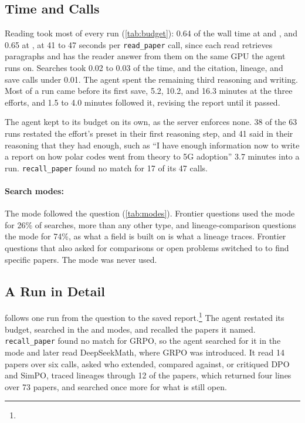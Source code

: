 \FloatBarrier
\subsection{Time and Calls}

Reading took most of every run (\cref{tab:budget}): 0.64 of the wall time at  and , and 0.65 at , at 41 to 47 seconds per \texttt{read\_paper} call, since each read retrieves paragraphs and has the reader answer from them on the same GPU the agent runs on. Searches took 0.02 to 0.03 of the time, and the citation, lineage, and save calls under 0.01. The agent spent the remaining third reasoning and writing. Most of a run came before its first save, 5.2, 10.2, and 16.3 minutes at the three efforts, and 1.5 to 4.0 minutes followed it, revising the report until it passed.

The agent kept to its budget on its own, as the server enforces none. 38 of the 63 runs restated the effort's preset in their first reasoning step, and 41 said in their reasoning that they had enough, such as ``I have enough information now to write a report on how polar codes went from theory to 5G adoption'' 3.7 minutes into a  run. \texttt{recall\_paper} found no match for 17 of its 47 calls.

\paragraph{Search modes:}
The mode followed the question (\cref{tab:modes}). Frontier questions used the  mode for 26\% of searches, more than any other type, and lineage-comparison questions the  mode for 74\%, as what a field is built on is what a lineage traces. Frontier questions that also asked for comparisons or open problems switched to  to find specific papers. The  mode was never used.




\FloatBarrier
\subsection{A Run in Detail}
\label{app:trace}

 follows one  run from the question to the saved report.\footnote{} The agent restated its budget, searched in the  and  modes, and recalled the papers it named. \texttt{recall\_paper} found no match for GRPO, so the agent searched for it in the  mode and later read DeepSeekMath, where GRPO was introduced. It read 14 papers over six calls, asked who extended, compared against, or critiqued DPO and SimPO, traced lineages through 12 of the papers, which returned four lines over 73 papers, and searched once more for what is still open.

